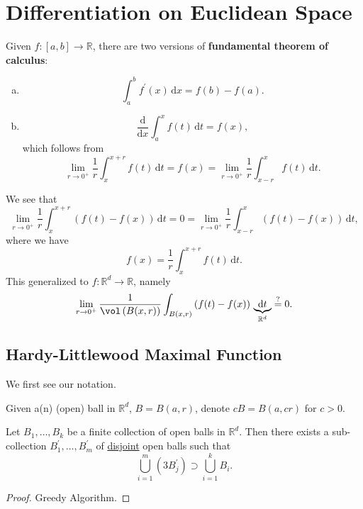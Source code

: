 \chapter{Differentiation on Euclidean Space}\label{ch:Differentiation-on-Euclidean-Space}
\begin{prev}
	Given \(f\colon [a, b]\to \mathbb{R} \), there are two versions of \textbf{fundamental theorem of calculus}:
	\begin{enumerate}[(a)]
		\item
		      \[
			      \int_{a}^{b} f^\prime (x) \,\mathrm{d}x = f(b) - f(a).
		      \]
		\item
		      \[
			      \frac{\mathrm{d}}{\mathrm{d}x} \int_{a}^{x} f(t) \,\mathrm{d}t = f(x),
		      \]
		      which follows from
		      \[
			      \lim_{r \to 0^+} \frac{1}{r}\int_{x}^{x+r} f(t) \,\mathrm{d}t = f(x) = \lim_{r \to 0^+} \frac{1}{r}\int_{x-r}^{x} f(t) \,\mathrm{d}t.
		      \]
	\end{enumerate}
\end{prev}
\begin{remark}
	We see that
	\[
		\lim_{r \to 0^+} \frac{1}{r}\int_{x}^{x+r} \left(f(t)-f(x)\right) \,\mathrm{d}t = 0 = \lim_{r \to 0^+} \frac{1}{r}\int_{x-r}^{x} \left(f(t)-f(x)\right) \,\mathrm{d}t,
	\]
	where we have
	\[
		f(x) = \frac{1}{r}\int_{x}^{x+r} f(t) \,\mathrm{d}t.
	\]
	This generalized to \(f\colon \mathbb{R} ^d\to \mathbb{R} \), namely
	\[
		\lim_{r \to 0^+} \frac{1}{\vol \left(B(x, r)\right)}\int_{B(x, r)}\left(f(t)-f(x)\right)\,\underbrace{\mathrm{d}t}_{\mathbb{R} ^d} \overset{?}{=} 0.
	\]
\end{remark}
\section{Hardy-Littlewood Maximal Function}
We first see our notation.
\begin{notation}
	Given a(n) (open) ball in \(\mathbb{R} ^d\), \(B = B(a, r)\), denote \(cB = B(a, cr)\) for \(c>0\).
\end{notation}

\begin{lemma}\label{lma:Vitali-type-covering-lemma}
	Let \(B_1, \dots , B_k \) be a finite collection of open balls in \(\mathbb{R} ^d\). Then there
	exists a sub-collection \(B^\prime _1, \dots , B^\prime _m \) of \underline{disjoint} open balls such that
	\[
		\bigcup_{i=1}^{m} \left(3 B_{j} ^\prime \right)\supset \bigcup_{i=1}^{k} B_{i}.
	\]
\end{lemma}
\begin{proof}
	Greedy Algorithm.
\end{proof}